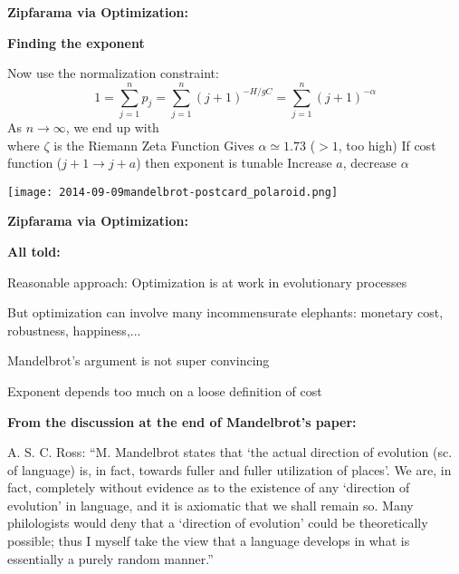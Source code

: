   \textbf{Zipfarama via Optimization:}

  \textbf{Finding the exponent}
  
   Now use the normalization constraint:
    $$ 
    1 = \sum_{j=1}^n p_j
    {
      = \sum_{j=1}^n (j+1)^{-H/gC}
    }
    {
      = \sum_{j=1}^n (j+1)^{-\alpha}
    }
    $$
   As $n \rightarrow \infty$, we end up with \\
    where $\zeta$ is the Riemann Zeta Function
   Gives $\alpha \simeq 1.73$ ($> 1$, too high)
   If cost function  ($j+1 \rightarrow j+a$)
    then exponent is tunable
   Increase $a$, decrease $\alpha$
  

  

  \texttt{[image: 2014-09-09mandelbrot-postcard\_polaroid.png]}

  \textbf{Zipfarama via Optimization:}

  \textbf{All told:}
    
     
      Reasonable approach: Optimization is at work in evolutionary processes
     
      But optimization can involve many incommensurate elephants:
      monetary cost, robustness, happiness,...
     
      Mandelbrot's argument is not super convincing
     
      Exponent depends too much on a loose definition of cost
    
  




  \textbf{From the discussion at the end of Mandelbrot's paper:}
    
    
      A. S. C. Ross: 
      ``M. Mandelbrot states that `the actual direction of evolution
      (sc. of language) is, in fact, towards fuller and fuller utilization
      of places'. We are, in fact, completely without evidence as to the
      existence of any `direction of evolution' in language, and it is
      axiomatic that we shall remain so. Many philologists would deny that a
      `direction of evolution' could be theoretically possible; thus I
      myself take the view that a language develops in what is essentially a
      purely random manner.''
    
